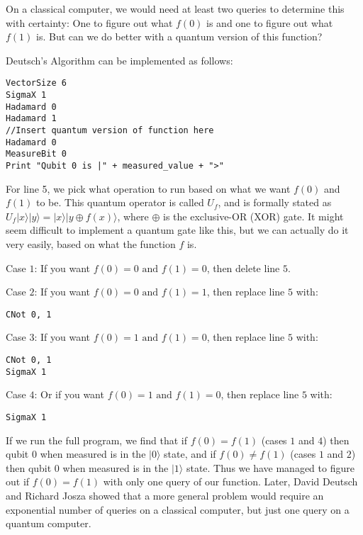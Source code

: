 \documentclass[twocolumn]{article}
\begin{document}
On a classical computer, we would need at least two queries to determine this with certainty: One to figure out what $f(0)$ is and one to figure out what $f(1)$ is. But can we do better with a quantum version of this function?

Deutsch's Algorithm can be implemented as follows:

\begin{lstlisting}
VectorSize 6
SigmaX 1
Hadamard 0
Hadamard 1
//Insert quantum version of function here
Hadamard 0
MeasureBit 0
Print "Qubit 0 is |" + measured_value + ">"
\end{lstlisting}

For line 5, we pick what operation to run based on what we want $f(0)$ and $f(1)$ to be. This quantum operator is called $U_f$, and is formally stated as $U_f|x\rangle|y\rangle = |x\rangle|y \oplus f(x)\rangle$, where $\oplus$ is the exclusive-OR (XOR) gate. It might seem difficult to implement a quantum gate like this, but we can actually do it very easily, based on what the function $f$ is.

Case $1$: If you want $f(0) = 0 \text{ and } f(1) = 0$, then delete line $5$.

Case $2$: If you want $f(0) = 0 \text{ and } f(1) = 1$, then replace line $5$ with:

\begin{lstlisting}
CNot 0, 1
\end{lstlisting}

Case $3$: If you want $f(0) = 1 \text{ and } f(1) = 0$, then replace line $5$ with:

\begin{lstlisting}
CNot 0, 1
SigmaX 1
\end{lstlisting}

Case $4$: Or if you want $f(0) = 1 \text{ and } f(1) = 0$, then replace line $5$ with:

\begin{lstlisting}
SigmaX 1
\end{lstlisting}

If we run the full program, we find that if $f(0) = f(1)$ (cases $1$ and $4$) then qubit $0$ when measured is in the $|0\rangle$ state, and if $f(0) \neq f(1)$ (cases $1$ and $2$) then qubit $0$ when measured is in the $|1\rangle$ state. Thus we have managed to figure out if $f(0) = f(1)$ with only one query of our function. Later, David Deutsch and Richard Josza showed that a more general problem would require an exponential number of queries on a classical computer, but just one query on a quantum computer.
\end{document}

